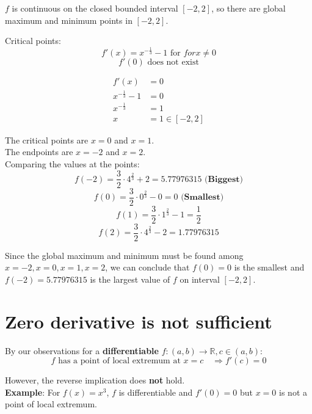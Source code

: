 \documentclass[11pt]{article}
\begin{document}
\(f\) is continuous on the closed bounded interval \([-2, 2]\), so there are global maximum and minimum points in \([-2, 2]\).

Critical points:
\[f'(x) = x^{-\frac{1}{3}} - 1 \text{ for } for x \neq 0\]
\[f'(0) \text{ does not exist}\]

\begin{align*}
f'(x) &= 0 \\
x^{-\frac{1}{3}} - 1 &= 0 \\
x^{-\frac{1}{3}} &= 1 \\
x &= 1 \in [-2, 2]
\end{align*}

The critical points are \(x = 0\) and \(x = 1\).
\\[0pt]

The endpoints are \(x = -2\) and \(x = 2\).
\\[0pt]

Comparing the values at the points:
\[f(-2) = \frac{3}{2} \cdot 4^{\frac{2}{3}} + 2 = 5.77976315 \textbf{ (Biggest)}\]
\[f(0) = \frac{3}{2} \cdot 0^{\frac{2}{3}} - 0 = 0 \textbf{ (Smallest)}\]
\[f(1) = \frac{3}{2} \cdot 1^{\frac{2}{3}} - 1 = \frac{1}{2}\]
\[f(2) = \frac{3}{2} \cdot 4^{\frac{2}{3}} - 2 = 1.77976315\]

Since the global maximum and minimum must be found among \(x = -2, x = 0, x = 1, x = 2\), we can conclude that \(f(0) = 0\) is the smallest and \(f(-2) = 5.77976315\) is the largest value of \(f\) on interval \([-2, 2]\).

\section{Zero derivative is not sufficient}
\label{sec:orgcd9a6e3}
By our observations for a \textbf{differentiable} \(f : (a, b) \rightarrow \mathbb{R}, c \in (a, b)\):
\[f \text{ has a point of local extremum at } x = c \quad \Rightarrow f'(c) = 0\]

However, the reverse implication does \textbf{not} hold.
\\[0pt]

\textbf{Example}: For \(f(x) = x^3\), \(f\) is differentiable and \(f'(0) = 0\) but \(x = 0\) is not a point of local extremum.
\end{document}
